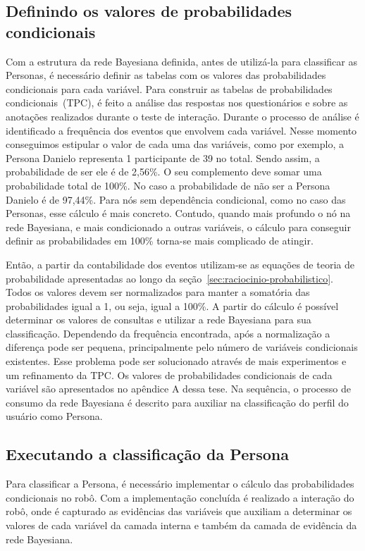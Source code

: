 \subsection{Definindo os valores de probabilidades condicionais}
\label{sec:tpc}
Com a estrutura da rede Bayesiana definida, antes de utilizá-la para classificar as Personas, é necessário definir as tabelas com os valores das probabilidades condicionais para cada variável. Para construir as tabelas de probabilidades condicionais~(TPC), é feito a análise das respostas nos questionários e sobre as anotações realizados durante o teste de interação. Durante o processo de análise é identificado a frequência dos eventos que envolvem cada variável. Nesse momento conseguimos estipular o valor de cada uma das variáveis, como por exemplo, a Persona Danielo representa 1 participante de 39 no total. Sendo assim, a probabilidade de ser ele é de 2,56\%. O seu complemento deve somar uma probabilidade total de 100\%. No caso a probabilidade de não ser a Persona Danielo é de 97,44\%. Para nós sem dependência condicional, como no caso das Personas, esse cálculo é mais concreto. Contudo, quando mais profundo o nó na rede Bayesiana, e mais condicionado a outras variáveis, o cálculo para conseguir definir as probabilidades em 100\% torna-se mais complicado de atingir.

 Então, a partir da contabilidade dos eventos utilizam-se as equações de teoria de probabilidade apresentadas ao longo da seção~\ref{sec:raciocinio-probabilistico}. Todos os valores devem ser normalizados para manter a somatória das probabilidades igual a 1, ou seja, igual a 100\%. A partir do cálculo é possível determinar os valores de consultas e utilizar a rede Bayesiana para sua classificação. Dependendo da frequência encontrada, após a normalização a diferença pode ser pequena, principalmente pelo número de variáveis condicionais existentes. Esse problema pode ser solucionado através de mais experimentos e um refinamento da TPC. Os valores de probabilidades condicionais de cada variável são apresentados no apêndice A dessa tese. Na sequência, o processo de consumo da rede Bayesiana é descrito para auxiliar na classificação do perfil do usuário como Persona.

\subsection{Executando a classificação da Persona}
\label{sec:consumo}
Para classificar a Persona, é necessário implementar o cálculo das probabilidades condicionais no robô. Com a implementação concluída é realizado a interação do robô, onde é capturado as evidências das variáveis que auxiliam a determinar os valores de cada variável da camada interna e também da camada de evidência da rede Bayesiana.

